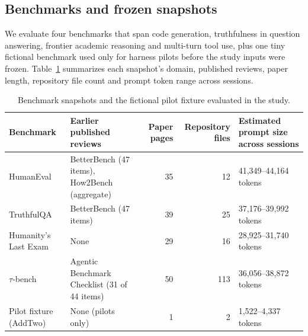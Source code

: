\documentclass[10pt,conference]{IEEEtran}
\begin{document}
\subsection{Benchmarks and frozen snapshots}
We evaluate four benchmarks that span code generation, truthfulness in question answering, frontier academic reasoning and multi-turn tool use, plus one tiny fictional benchmark used only for harness pilots before the study inputs were frozen. Table~\ref{tab:benchmarks} summarizes each snapshot's domain, published reviews, paper length, repository file count and prompt token range across sessions.

\begin{table}[t]
\caption{Benchmark snapshots and the fictional pilot fixture evaluated in the study.}
\label{tab:benchmarks}
\centering
\small
\begin{tabularx}{\textwidth}{@{}llrrX@{}}
\toprule
\textbf{Benchmark} & \textbf{Earlier published reviews} & \textbf{Paper pages} & \textbf{Repository files} & \textbf{Estimated prompt size across sessions} \\
\midrule
HumanEval \cite{human_eval_repository} & BetterBench (47 items), How2Bench (aggregate) & 35 & 12 & 41,349--44,164 tokens \\
TruthfulQA \cite{truthfulqa_repository} & BetterBench (47 items) & 39 & 25 & 37,176--39,992 tokens \\
Humanity's Last Exam \cite{phan_etal_hle_2025} & None & 29 & 16 & 28,925--31,740 tokens \\
$\tau$-bench \cite{tau_bench_repository} & Agentic Benchmark Checklist (31 of 44 items) & 50 & 113 & 36,056--38,872 tokens \\
Pilot fixture (AddTwo) & None (pilots only) & 1 & 2 & 1,522--4,337 tokens \\
\bottomrule
\end{tabularx}
\end{table}
\end{document}
